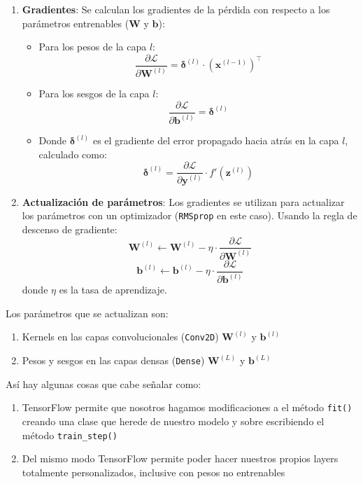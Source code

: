 \documentclass[../main.tex]{subfiles}
\begin{document}
\begin{itemize}
\begin{enumerate}
      \begin{enumerate}
          \item \textbf{Gradientes}:
          Se calculan los gradientes de la pérdida con respecto a los parámetros entrenables (\(\mathbf{W}\) y \(\mathbf{b}\)):
          \begin{itemize}
              \item Para los pesos de la capa \(l\):
              \[
              \frac{\partial \mathcal{L}}{\partial \mathbf{W}^{(l)}} = \mathbf{\delta}^{(l)} \cdot (\mathbf{x}^{(l-1)})^\top
              \]
              \item Para los sesgos de la capa \(l\):
              \[
              \frac{\partial \mathcal{L}}{\partial \mathbf{b}^{(l)}} = \mathbf{\delta}^{(l)}
              \]
              \item Donde \(\mathbf{\delta}^{(l)}\) es el gradiente del error propagado hacia atrás en la capa \(l\), calculado como:
              \[
              \mathbf{\delta}^{(l)} = \frac{\partial \mathcal{L}}{\partial \mathbf{y}^{(l)}} \cdot f'(\mathbf{z}^{(l)})
              \]
          \end{itemize}
          \item \textbf{Actualización de parámetros}:
          Los gradientes se utilizan para actualizar los parámetros con un optimizador (\texttt{RMSprop} en este caso). Usando la regla de descenso de gradiente:
          \[
          \mathbf{W}^{(l)} \leftarrow \mathbf{W}^{(l)} - \eta \cdot \frac{\partial \mathcal{L}}{\partial \mathbf{W}^{(l)}}
          \]
          \[
          \mathbf{b}^{(l)} \leftarrow \mathbf{b}^{(l)} - \eta \cdot \frac{\partial \mathcal{L}}{\partial \mathbf{b}^{(l)}}
          \]
          donde \(\eta\) es la tasa de aprendizaje.
      \end{enumerate}

    \end{enumerate}

  Los parámetros que se actualizan son:

  \begin{enumerate}
      \item Kernels en las capas convolucionales (\texttt{Conv2D})
      \(\mathbf{W}^{(l)}\) y \(\mathbf{b}^{(l)}\)
      \item Pesos y sesgos en las capas densas (\texttt{Dense})
      \(\mathbf{W}^{(L)}\) y \(\mathbf{b}^{(L)}\)
  \end{enumerate}

  Así hay algunas cosas que cabe señalar como:

  \begin{enumerate}
    \item TensorFlow permite que nosotros hagamos modificaciones a el método  \texttt{fit()} creando una clase que herede de nuestro modelo y sobre escribiendo el método \texttt{train\_step()} \cite{customizing_fit}
    \item Del mismo modo TensorFlow permite poder hacer nuestros propios layers totalmente personalizados, inclusive con pesos no entrenables \cite{making_new_layer}
  \end{enumerate}

\end{itemize}
\end{document}
